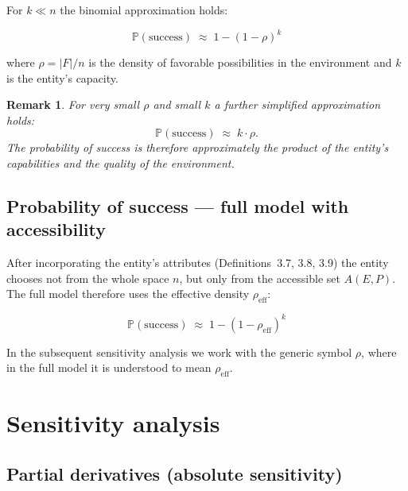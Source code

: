 \documentclass[12pt,a4paper]{article}
\newtheorem{remark}{Remark}[section]
\begin{document}
For $k \ll n$ the binomial approximation holds:

\begin{equation}\label{eq:approx}
    \mathbb{P}(\text{success}) \;\approx\; 1 - (1 - \rho)^k
\end{equation}

where $\rho = |F|/n$ is the density of favorable possibilities in the environment and $k$ is the entity's capacity.

\begin{remark}
For very small $\rho$ and small $k$ a further simplified approximation holds:
\begin{equation}\label{eq:linear}
    \mathbb{P}(\text{success}) \;\approx\; k \cdot \rho.
\end{equation}
The probability of success is therefore approximately the product of the entity's capabilities and the quality of the environment.
\end{remark}

\subsection{Probability of success — full model with accessibility}

After incorporating the entity's attributes (Definitions~3.7, 3.8, 3.9) the entity chooses not from the whole space $n$, but only from the accessible set $A(E, P)$. The full model therefore uses the effective density $\rho_{\text{eff}}$:

\begin{equation}\label{eq:uplny}
    \boxed{\;\mathbb{P}(\text{success}) \;\approx\; 1 - (1 - \rho_{\text{eff}})^k\;}
\end{equation}

In the subsequent sensitivity analysis we work with the generic symbol $\rho$, where in the full model it is understood to mean $\rho_{\text{eff}}$.

\section{Sensitivity analysis}

\subsection{Partial derivatives (absolute sensitivity)}
\end{document}
